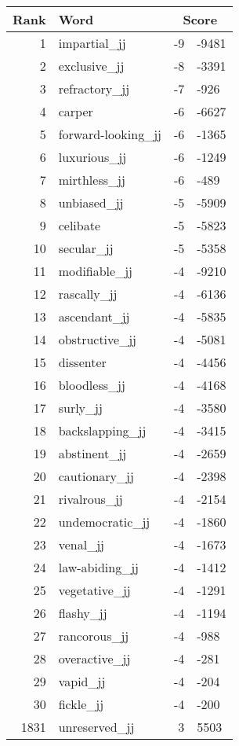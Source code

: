 \begin{longtable}[!htbp]{| rlr@{.}l |}
    \hline
    \textbf{Rank} & \textbf{Word} & \multicolumn{2}{c|}{\textbf{Score}} \\
    \hline
    \endhead
    1 & impartial\_jj & -9 & -9481 \\
    2 & exclusive\_jj & -8 & -3391 \\
    3 & refractory\_jj & -7 & -926 \\
    4 & carper & -6 & -6627 \\
    5 & forward-looking\_jj & -6 & -1365 \\
    6 & luxurious\_jj & -6 & -1249 \\
    7 & mirthless\_jj & -6 & -489 \\
    8 & unbiased\_jj & -5 & -5909 \\
    9 & celibate & -5 & -5823 \\
    10 & secular\_jj & -5 & -5358 \\
    11 & modifiable\_jj & -4 & -9210 \\
    12 & rascally\_jj & -4 & -6136 \\
    13 & ascendant\_jj & -4 & -5835 \\
    14 & obstructive\_jj & -4 & -5081 \\
    15 & dissenter & -4 & -4456 \\
    16 & bloodless\_jj & -4 & -4168 \\
    17 & surly\_jj & -4 & -3580 \\
    18 & backslapping\_jj & -4 & -3415 \\
    19 & abstinent\_jj & -4 & -2659 \\
    20 & cautionary\_jj & -4 & -2398 \\
    21 & rivalrous\_jj & -4 & -2154 \\
    22 & undemocratic\_jj & -4 & -1860 \\
    23 & venal\_jj & -4 & -1673 \\
    24 & law-abiding\_jj & -4 & -1412 \\
    25 & vegetative\_jj & -4 & -1291 \\
    26 & flashy\_jj & -4 & -1194 \\
    27 & rancorous\_jj & -4 & -988 \\
    28 & overactive\_jj & -4 & -281 \\
    29 & vapid\_jj & -4 & -204 \\
    30 & fickle\_jj & -4 & -200 \\
    1831 & unreserved\_jj & 3 & 5503 \\

\end{longtable}
